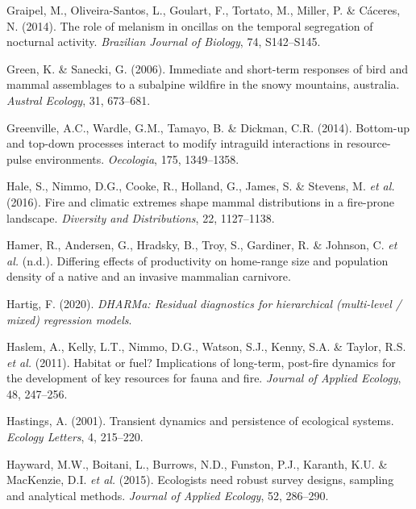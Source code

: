 \documentclass[11pt,a4paper,titlepage,twoside,openright]{style/unimelbthesis}
\begin{document}
\begin{mainmatter}
\leavevmode\hypertarget{ref-graipel2014role}{}%
Graipel, M., Oliveira-Santos, L., Goulart, F., Tortato, M., Miller, P. \& Cáceres, N. (2014). The role of melanism in oncillas on the temporal segregation of nocturnal activity. \emph{Brazilian Journal of Biology}, 74, S142--S145.

\leavevmode\hypertarget{ref-green2006immediate}{}%
Green, K. \& Sanecki, G. (2006). Immediate and short-term responses of bird and mammal assemblages to a subalpine wildfire in the snowy mountains, australia. \emph{Austral Ecology}, 31, 673--681.

\leavevmode\hypertarget{ref-greenville2014bottom}{}%
Greenville, A.C., Wardle, G.M., Tamayo, B. \& Dickman, C.R. (2014). Bottom-up and top-down processes interact to modify intraguild interactions in resource-pulse environments. \emph{Oecologia}, 175, 1349--1358.

\leavevmode\hypertarget{ref-hale2016fire}{}%
Hale, S., Nimmo, D.G., Cooke, R., Holland, G., James, S. \& Stevens, M. \emph{et al.} (2016). Fire and climatic extremes shape mammal distributions in a fire-prone landscape. \emph{Diversity and Distributions}, 22, 1127--1138.

\leavevmode\hypertarget{ref-hamerdiffering}{}%
Hamer, R., Andersen, G., Hradsky, B., Troy, S., Gardiner, R. \& Johnson, C. \emph{et al.} (n.d.). Differing effects of productivity on home-range size and population density of a native and an invasive mammalian carnivore.

\leavevmode\hypertarget{ref-DHARMa}{}%
Hartig, F. (2020). \emph{DHARMa: Residual diagnostics for hierarchical (multi-level / mixed) regression models}.

\leavevmode\hypertarget{ref-haslem2011habitat}{}%
Haslem, A., Kelly, L.T., Nimmo, D.G., Watson, S.J., Kenny, S.A. \& Taylor, R.S. \emph{et al.} (2011). Habitat or fuel? Implications of long-term, post-fire dynamics for the development of key resources for fauna and fire. \emph{Journal of Applied Ecology}, 48, 247--256.

\leavevmode\hypertarget{ref-hastings2001transient}{}%
Hastings, A. (2001). Transient dynamics and persistence of ecological systems. \emph{Ecology Letters}, 4, 215--220.

\leavevmode\hypertarget{ref-hayward2015ecologists}{}%
Hayward, M.W., Boitani, L., Burrows, N.D., Funston, P.J., Karanth, K.U. \& MacKenzie, D.I. \emph{et al.} (2015). Ecologists need robust survey designs, sampling and analytical methods. \emph{Journal of Applied Ecology}, 52, 286--290.


\end{mainmatter}
\end{document}
